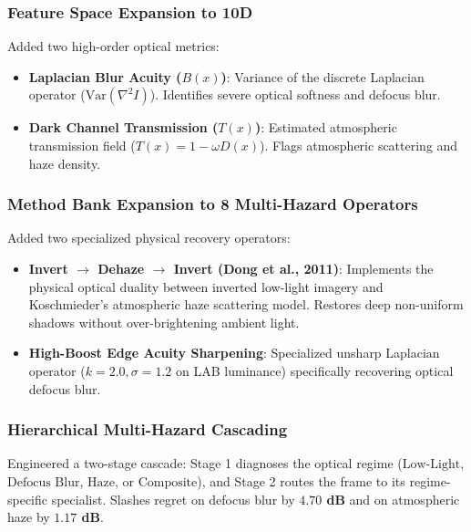 \documentclass[10pt,a4paper]{article}
\begin{document}
\subsubsection{Feature Space Expansion to 10D}
Added two high-order optical metrics:
\begin{itemize}[leftmargin=*]
    \item \textbf{Laplacian Blur Acuity ($B(x)$)}: Variance of the discrete Laplacian operator ($\text{Var}(\nabla^2 I)$). Identifies severe optical softness and defocus blur.
    \item \textbf{Dark Channel Transmission ($T(x)$)}: Estimated atmospheric transmission field ($T(x) = 1 - \omega D(x)$). Flags atmospheric scattering and haze density.
\end{itemize}

\subsubsection{Method Bank Expansion to 8 Multi-Hazard Operators}
Added two specialized physical recovery operators:
\begin{itemize}[leftmargin=*]
    \item \textbf{Invert $\to$ Dehaze $\to$ Invert (Dong et al., 2011)}: Implements the physical optical duality between inverted low-light imagery and Koschmieder's atmospheric haze scattering model. Restores deep non-uniform shadows without over-brightening ambient light.
    \item \textbf{High-Boost Edge Acuity Sharpening}: Specialized unsharp Laplacian operator ($k=2.0, \sigma=1.2$ on LAB luminance) specifically recovering optical defocus blur.
\end{itemize}

\subsubsection{Hierarchical Multi-Hazard Cascading}
Engineered a two-stage cascade: Stage 1 diagnoses the optical regime ($\text{Low-Light}$, $\text{Defocus Blur}$, $\text{Haze}$, or $\text{Composite}$), and Stage 2 routes the frame to its regime-specific specialist. Slashes regret on defocus blur by \textbf{$4.70$ dB} and on atmospheric haze by \textbf{$1.17$ dB}.
\end{document}
